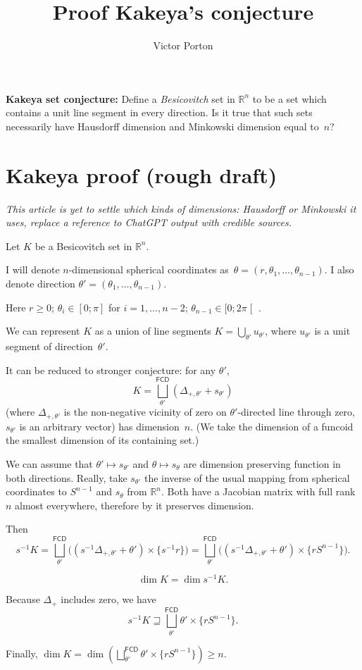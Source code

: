 \documentclass{amsart}
\title{Proof Kakeya's conjecture}
\author{Victor Porton}
\newcommand{\funcoids}{\mathsf{FCD}}
\begin{document}
\textbf{Kakeya set conjecture:} Define a \emph{Besicovitch} set in $\mathbb{R}^n$ to be a set which contains a unit line segment in every direction. Is it true that such sets necessarily have Hausdorff dimension and Minkowski dimension equal to~$n$?

\section{Kakeya proof (rough draft)}

\emph{This article is yet to settle which kinds of dimensions: Hausdorff or Minkowski it uses, replace a reference to ChatGPT output with credible sources.}

Let $K$ be a Besicovitch set in $\mathbb{R}^n$.

I will denote $n$-dimensional spherical coordinates as~$\theta=(r, \theta_1,\dots,\theta_{n-1})$.
I also denote direction $\theta'=(\theta_1,\dots,\theta_{n-1})$.

Here $r\geq 0$; $\theta_i\in[0;\pi]$ for $i=1,\dots,n-2$; $\theta_{n-1}\in[0;2\pi\mathclose[$ .

We can represent $K$ as a union of line segments $K = \bigcup_{\theta'} u_{\theta'}$, where $u_{\theta'}$ is a unit segment of direction~$\theta'$.

It can be reduced to stronger conjecture: for any $\theta'$, \[ K = \bigsqcup^{\funcoids}_{\theta'} (\Delta_{+,\theta'}+s_{\theta'}) \] (where $\Delta_{+,\theta'}$ is the non-ne\-ga\-ti\-ve vicinity of zero on $\theta'$-di\-rec\-ted line through zero, $s_{\theta'}$ is an arbitrary vector) has dimension~$n$. (We take the dimension of a funcoid the smallest dimension of its containing set.)

We can assume that $\theta'\mapsto s_{\theta'}$ and $\theta\mapsto s_{\theta}$ are dimension preserving function in both directions. Really,
take $s_{\theta'}$ the inverse of the usual mapping from spherical coordinates to $S^{n-1}$ and $s_{\theta}$ from $\mathbb{R}^n$. Both have
a Jacobian matrix with full rank $n$ almost everywhere, therefore by \cite{gpt-preserve-dim} it preserves dimension.

Then \[ s^{-1}K = \bigsqcup^{\funcoids}_{\theta'} \bigl((s^{-1}\Delta_{+,\theta'}+\theta')\times\{s^{-1}r\}\bigr) =
\bigsqcup^{\funcoids}_{\theta'} \bigl((s^{-1}\Delta_{+,\theta'}+\theta')\times\{rS^{n-1}\}\bigr). \]

\[ \dim K = \dim s^{-1}K. \]

Because $\Delta_{+}$ includes zero, we have \[ s^{-1}K \sqsupseteq \bigsqcup^{\funcoids}_{\theta'} \theta' \times\{rS^{n-1}\}. \]

Finally, $\dim K=\dim\left(\bigsqcup^{\funcoids}_{\theta'} \theta' \times\{rS^{n-1}\}\right)\geq n$.



\end{document}
